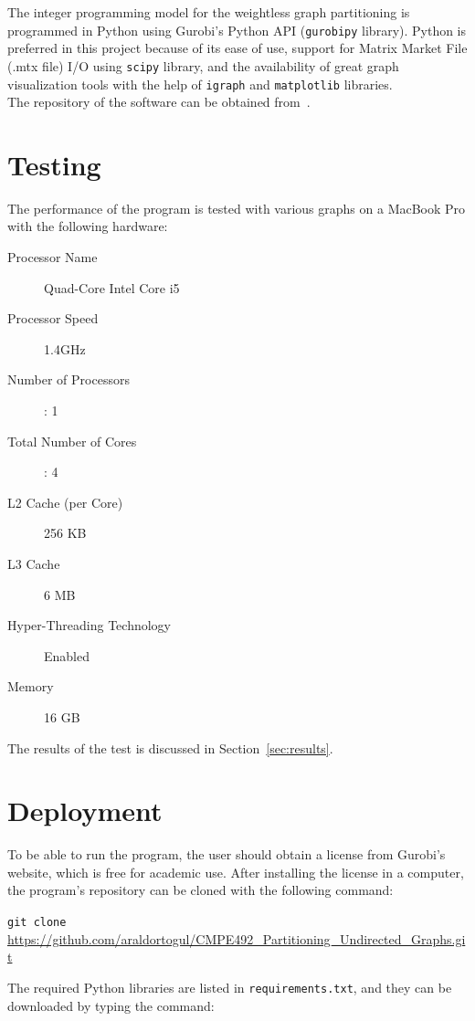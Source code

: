 \documentclass[a4paper,12pt]{report}
\begin{document}
The integer programming model for the weightless graph partitioning is programmed in Python using Gurobi's Python API (\texttt{gurobipy} library). Python is preferred in this project because of its ease of use, support for Matrix Market File (.mtx file) I/O using \texttt{scipy} library, and the availability of great graph visualization tools with the help of \texttt{igraph} and \texttt{matplotlib} libraries.\\
The repository of the software can be obtained from~\cite{dortogul}.

\section{Testing}

The performance of the program is tested with various graphs on a MacBook Pro with the following hardware:

\begin{description}
	\item[Processor Name] Quad-Core Intel Core i5
	\item[Processor Speed] 1.4GHz
	\item[Number of Processors]: 1
	\item[Total Number of Cores]: 4
	\item[L2 Cache (per Core)] 256 KB
	\item[L3 Cache] 6 MB
	\item[Hyper-Threading Technology] Enabled
	\item[Memory] 16 GB
\end{description}

The results of the test is discussed in Section~\ref{sec:results}.

\section{Deployment}

To be able to run the program, the user should obtain a license from Gurobi's website, which is free for academic use. After installing the license in a computer, the program's repository can be cloned with the following command:

\noindent \texttt{git clone}\\
{\small \url{https://github.com/araldortogul/CMPE492_Partitioning_Undirected_Graphs.git}}

The required Python libraries are listed in \texttt{requirements.txt}, and they can be downloaded by typing the command:
\end{document}
